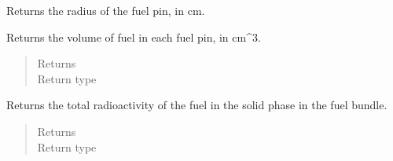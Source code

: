 \documentclass[letterpaper,10pt,openany,oneside,english]{sphinxmanual}
\begin{document}
\begin{fulllineitems}

\begin{fulllineitems}
\label{\detokenize{support_rst/fuel_bundle:fuel_bundle.FuelBundle.fuel_pin_radius}}
Returns the radius of the fuel pin, in cm.

\end{fulllineitems}


\begin{fulllineitems}
\label{\detokenize{support_rst/fuel_bundle:fuel_bundle.FuelBundle.fuel_pin_volume}}
Returns the volume of fuel in each fuel pin, in cm\textasciicircum{}3.
\begin{quote}\begin{description}
\item[{Returns}] \leavevmode
{}

\item[{Return type}] \leavevmode
{}

\end{description}\end{quote}

\end{fulllineitems}


\begin{fulllineitems}
\label{\detokenize{support_rst/fuel_bundle:fuel_bundle.FuelBundle.fuel_radioactivity}}
Returns the total radioactivity of the fuel in the solid phase in the
fuel bundle.
\begin{quote}\begin{description}
\item[{Returns}] \leavevmode
{}

\item[{Return type}] \leavevmode
{}

\end{description}\end{quote}


\end{fulllineitems}
\end{fulllineitems}
\end{document}
